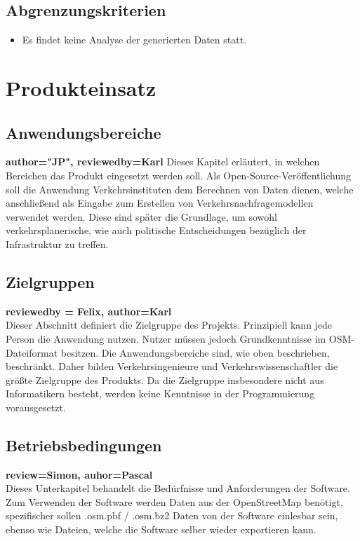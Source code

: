 \documentclass[parskip=full]{scrartcl} %
\begin{document}
\subsection{Abgrenzungskriterien}
\begin{itemize}
    \item Es findet keine Analyse der generierten Daten statt.
\end{itemize}
\newpage











\section{Produkteinsatz}

\subsection{Anwendungsbereiche}
\textbf{author="JP", reviewedby=Karl} 
Dieses Kapitel erläutert, in welchen Bereichen das Produkt eingesetzt werden soll. Als Open-Source-Veröffentlichung soll die Anwendung Verkehrsinstituten dem Berechnen von Daten dienen, welche anschließend als Eingabe zum Erstellen von Verkehrsnachfragemodellen verwendet werden. Diese sind später die Grundlage, um sowohl verkehrsplanerische, wie auch politische Entscheidungen bezüglich der Infrastruktur zu treffen.




\subsection{Zielgruppen}
\textbf{reviewedby = Felix, author=Karl\\}
Dieser Abschnitt definiert die Zielgruppe des Projekts. Prinzipiell kann jede Person die Anwendung nutzen. Nutzer müssen jedoch Grundkenntnisse im OSM-Dateiformat besitzen. Die Anwendungsbereiche sind, wie oben beschrieben, beschränkt. Daher bilden Verkehrsingenieure und Verkehrswissenschaftler die größte Zielgruppe des Produkts. Da die Zielgruppe insbesondere nicht aus Informatikern besteht, werden keine Kenntnisse in der Programmierung vorausgesetzt.




\subsection{Betriebsbedingungen}
\textbf{review=Simon, auhor=Pascal\\}
Dieses Unterkapitel behandelt die Bedürfnisse und Anforderungen der Software.
Zum Verwenden der Software werden Daten aus der OpenStreetMap benötigt, spezifischer sollen .osm.pbf / .osm.bz2 Daten von der Software einlesbar sein, ebenso wie Dateien, welche die Software selber wieder exportieren kann.
\end{document}
